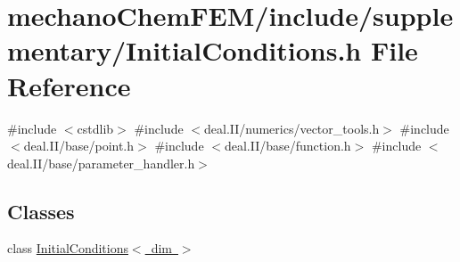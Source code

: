 \section{mechano\+Chem\+F\+E\+M/include/supplementary/\+Initial\+Conditions.h File Reference}
\label{_initial_conditions_8h}
{\ttfamily \#include $<$cstdlib$>$}\newline
{\ttfamily \#include $<$deal.\+I\+I/numerics/vector\+\_\+tools.\+h$>$}\newline
{\ttfamily \#include $<$deal.\+I\+I/base/point.\+h$>$}\newline
{\ttfamily \#include $<$deal.\+I\+I/base/function.\+h$>$}\newline
{\ttfamily \#include $<$deal.\+I\+I/base/parameter\+\_\+handler.\+h$>$}\newline
\subsection*{Classes}
\begin{DoxyCompactItemize}
\item 
class \mbox{\hyperlink{class_initial_conditions}{Initial\+Conditions$<$ dim $>$}}
\end{DoxyCompactItemize}
